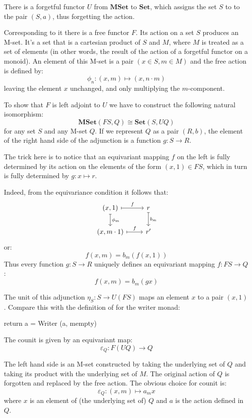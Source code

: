 \documentclass[DaoFP]{subfiles}
\begin{document}
There is a forgetful functor $U$ from $\mathbf{MSet}$ to $\mathbf{Set}$, which assigns the set $S$ to to the pair $(S, a)$, thus forgetting the action.  

Corresponding to it there is a free functor $F$. Its action on a set $S$ produces an M-set. It's a set that is a cartesian product of $S$ and $M$, where $M$ is treated as a set of elements (in other words, the result of the action of a forgetful functor on a monoid). An element of this M-set is a pair $(x \in S, m \in M)$ and the free action is defined by:
\[ \phi_n \colon (x, m) \mapsto (x, n \cdot m) \]
leaving the element $x$ unchanged, and only multiplying the $m$-component.

To show that $F$ is left adjoint to $U$ we have to construct the following natural isomorphism:
\[ \mathbf{MSet}( F S, Q) \cong \mathbf{Set}(S, U Q) \]
for any set $S$ and any M-set $Q$. If we represent $Q$ as a pair $(R, b)$, the element of the right hand side of the adjunction is a function $g \colon S \to R$. 

The trick here is to notice that an equivariant mapping $f$ on the left is fully determined by its action on the elements of the form $(x, 1) \in F S$, which in turn is fully determined by $g \colon x \mapsto r$. 

Indeed, from the equivariance condition it follows that:
\[
 \begin{tikzcd}
 (x, 1)
 \arrow[r, mapsto, "f"]
 \arrow[d, mapsto, "\phi_m"]
 & r
\arrow[d, mapsto, "b_m"]
 \\
(x, m \cdot 1)
 \arrow[r, mapsto, "f"]
 & r'
  \end{tikzcd}
\]
or:
\[ f (x, m) = b_m ( f (x, 1)) \]
Thus every function $g \colon S \to R$ uniquely defines an equivariant mapping $f \colon F S \to Q$:
\[ f (x, m) = b_m (g x) \]

The unit of this adjunction $\eta_S \colon S \to U (F S)$ maps an element $x$ to a pair $(x, 1)$. Compare this with the definition of  for the writer monad:
\begin{haskell}
return a = Writer (a, mempty)
\end{haskell}

The counit is given by an equivariant map:
\[ \varepsilon_Q \colon F (U Q) \to Q \]

The left hand side is an M-set constructed by taking the underlying set of $Q$ and taking its product with the underlying set of $M$. The original action of $Q$ is forgotten and replaced by the free action. The obvious choice for counit is:
\[ \varepsilon_Q \colon (x, m) \mapsto a_m x \]
where $x$ is an element of (the underlying set of) $Q$ and $a$ is the action defined in $Q$.
\end{document}
